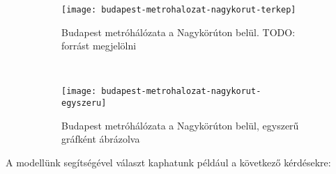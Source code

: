 	\begin{figure}[H]
		\begin{subfigure}[b]{0.5\textwidth}
			\centering
			\texttt{[image: budapest-metrohalozat-nagykorut-terkep]}
			\caption{Budapest metróhálózata a Nagykörúton belül. TODO: forrást megjelölni}
			\label{fig:budapest-metrohalozat-nagykorut-terkep}
		\end{subfigure}
		~ %
		\begin{subfigure}[b]{0.5\textwidth}
			\texttt{[image: budapest-metrohalozat-nagykorut-egyszeru]}
			\caption{Budapest metróhálózata a Nagykörúton belül, egyszerű gráfként ábrázolva}
			\label{fig:budapest-metrohalozat-nagykorut-egyszeru}
		\end{subfigure}
		\caption{}\label{fig:animals}
	\end{figure}


%	
%	

	A modellünk segítségével választ kaphatunk például a következő kérdésekre:
	
